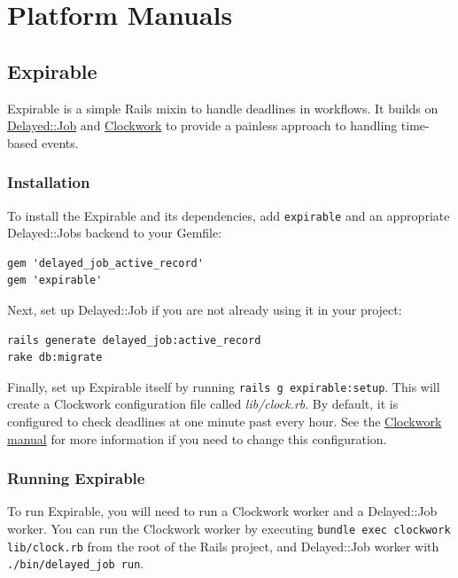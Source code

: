 \documentclass[document.tex]{subfiles}
\begin{document}
\chapter{Platform Manuals}
\label {ch:appendix-manuals}


\section{Expirable}

Expirable is a simple Rails mixin to handle deadlines in workflows.
It builds on \href{https://github.com/collectiveidea/delayed\_job}{Delayed::Job}
and \href{https://github.com/tomykaira/clockwork}{Clockwork} to provide a painless approach
to handling time-based events.

\subsection{Installation}

To install the Expirable and its dependencies, add {\tt expirable} and an
appropriate Delayed::Jobs backend to your Gemfile:

\begin{lstlisting}
gem 'delayed_job_active_record'
gem 'expirable'

\end{lstlisting}   %

Next, set up Delayed::Job if you are not already using it in your project:

\begin{lstlisting}
rails generate delayed_job:active_record
rake db:migrate

\end{lstlisting}   %

Finally, set up Expirable itself by running {\tt rails g expirable:setup}.
This will create a Clockwork configuration file called \emph{lib/clock.rb}.
By default, it is configured to check deadlines at one minute past every hour.
See the \href{https://github.com/tomykaira/clockwork\#clockwork---a-clock-process-to-replace-cron--}{Clockwork manual}
for more information if you need to change this configuration.

\subsection{Running Expirable}

To run Expirable, you will need to run a Clockwork worker and a Delayed::Job worker.
You can run the Clockwork worker by executing {\tt bundle exec clockwork lib/clock.rb}
from the root of the Rails project, and Delayed::Job worker with {\tt ./bin/delayed\_job run}.
\end{document}
